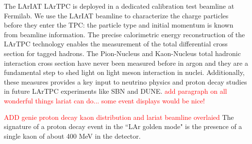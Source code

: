 The LArIAT LArTPC is deployed in a dedicated calibration test beamline at Fermilab.
We use the LArIAT beamline to characterize the charge particles before they enter the TPC: the particle type and initial momentum is known from beamline information. The precise calorimetric energy reconstruction of the LArTPC technology enables the measurement of the total differential cross section for  tagged hadrons. 
The Pion-Nucleus and Kaon-Nucleus total hadronic interaction cross section have never been measured before in argon and they are a fundamental step to shed light on light meson interaction in nuclei. Additionally, these measures provides a key input to neutrino physics and proton decay studies in future LArTPC experiments like SBN and DUNE.
\textcolor{red}{add paragraph on all wonderful things lariat can do... some event displays would be nice!}



\textcolor{red}{ADD genie proton decay kaon distribution and lariat beamline overlaied}
The signature of a proton decay event in the ``LAr golden mode" is the presence of a single kaon of about 400 MeV in the detector. 
